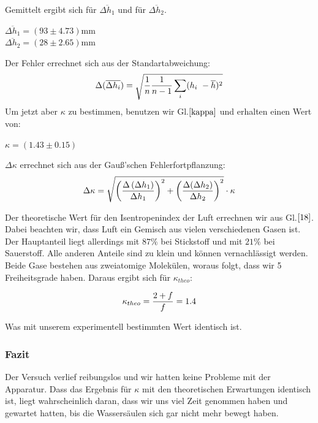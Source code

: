 \documentclass{article}
\begin{document}
{{\vspace{1cm}
Gemittelt ergibt sich für \(\overline{\Delta h_1}\) und für \(\overline{\Delta h_2}\).
\begin{center}
\(\overline{\Delta h_1} = (93\pm 4.73)\)mm\\
\(\overline{\Delta h_2} = (28\pm 2.65)\)mm
\end{center}

Der Fehler errechnet sich aus der Standartabweichung:
\begin{equation}
\notag
\Delta (\overline{\Delta h_i}) = \sqrt{\frac{1}{n}\frac{1}{n-1}\sum\limits_{i}(h_i \ - \overline{h})^2}
\end{equation}
\newpage
Um jetzt aber \(\kappa\) zu bestimmen, benutzen wir Gl.\(\eqref{kappa}\) und erhalten einen Wert von:

\begin{center}
\(\kappa = (1.43\pm 0.15)\)
\end{center}

\(\Delta\kappa\) errechnet sich aus der Gauß'schen Fehlerfortpflanzung:
\begin{equation}
\notag
\Delta\kappa = \sqrt{\left({\frac{\Delta \left(\Delta h_1\right)}{\Delta h_1}}\right)^2+\left(\frac{\Delta (\Delta h_2)}{\Delta h_2}\right)^2} \cdot\kappa
\end{equation}

Der theoretische Wert für den Isentropenindex der Luft errechnen wir aus Gl.\(\eqref{18}\). Dabei beachten wir, dass Luft ein Gemisch aus vielen verschiedenen Gasen ist. Der Hauptanteil liegt allerdings mit \(87\%\) bei Stickstoff und mit \(21\%\) bei Sauerstoff. Alle anderen Anteile sind zu klein und können vernachlässigt werden. Beide Gase bestehen aus zweiatomige Molekülen, woraus folgt, dass wir 5 Freiheitsgrade haben. Daraus ergibt sich für \(\kappa_{theo}\):

\begin{equation}
\notag
\kappa_{theo} = \frac{2+f}{f} = 1.4
\end{equation}
 
Was mit unserem experimentell bestimmten Wert identisch ist.

\subsubsection{Fazit}
Der Versuch verlief reibungslos und wir hatten keine Probleme mit der Apparatur. Dass das Ergebnis für \(\kappa\) mit den theoretischen Erwartungen identisch ist, liegt wahrscheinlich daran, dass wir uns viel Zeit genommen haben und gewartet hatten, bis die Wassersäulen sich gar nicht mehr bewegt haben.

}}
\end{document}
